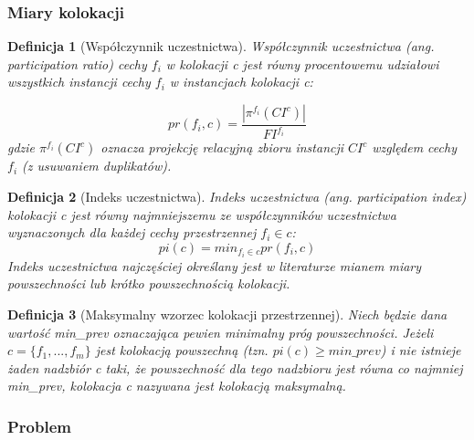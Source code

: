 \documentclass[12pt]{article}
\newtheorem{defin}{Definicja}
\begin{document}
\subsubsection{Miary kolokacji}

\begin{defin}[Współczynnik uczestnictwa]
Współczynnik uczestnictwa (ang. participation ratio) cechy $ f_{i} $ w kolokacji c jest równy procentowemu udziałowi wszystkich instancji cechy $ f_{i} $ w instancjach kolokacji c:

\begin{equation}
pr(f_{i}, c) = \frac{|\pi^{f_{i}}(CI^{c})|}{FI^{f_{i}}}
\end{equation}
gdzie $ \pi^{f_{i}}(CI^{c})$ oznacza projekcję relacyjną zbioru instancji $ CI^{c}$ względem cechy $f_{i}$ (z usuwaniem duplikatów).
\end{defin}

\begin{defin}[Indeks uczestnictwa]Indeks uczestnictwa (ang. participation index) kolokacji c jest równy najmniejszemu ze współczynników uczestnictwa wyznaczonych dla każdej cechy przestrzennej $ f_{i} \in c$:
\begin{equation}
pi(c) = min_{f_{i} \in c} pr(f_{i} ,c)
\end{equation}
Indeks uczestnictwa najczęściej określany jest w literaturze mianem miary powszechności lub krótko powszechnością kolokacji.
\label{def:prevalence}
\end{defin}

\begin{defin}[Maksymalny wzorzec kolokacji przestrzennej]Niech będzie dana wartość min\_prev oznaczająca pewien minimalny próg powszechności. Jeżeli $ c = \{f_{1},...,f_{m} \} $ jest kolokacją powszechną (tzn. $ pi(c) \ge min\_prev $) i nie istnieje żaden nadzbiór c taki, że powszechność dla tego nadzbioru jest równa co najmniej min\_prev, kolokacja c nazywana jest kolokacją maksymalną.  
\end{defin}

\subsubsection{Problem}

\end{document}
